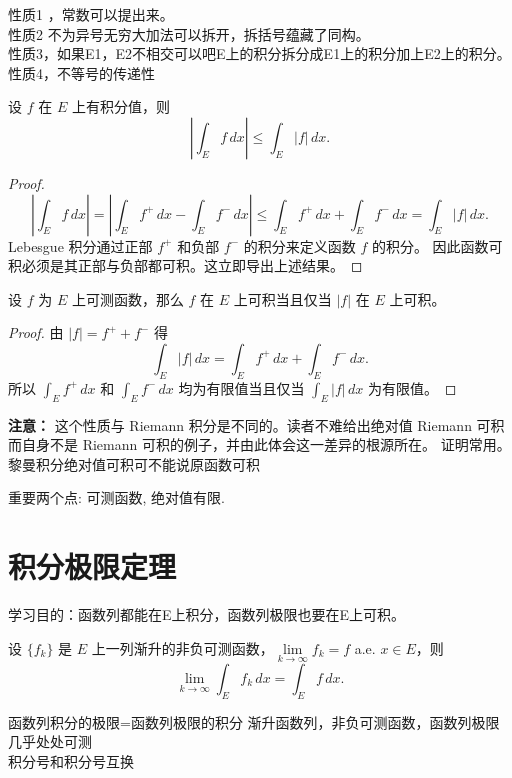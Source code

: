 \documentclass[lang=cn,10pt]{elegantbook}
\begin{document}
性质1 ，常数可以提出来。\\
性质2 不为异号无穷大加法可以拆开，拆括号蕴藏了同构。\\
性质3，如果E1，E2不相交可以吧E上的积分拆分成E1上的积分加上E2上的积分。\\
性质4，不等号的传递性\\
\begin{theorem}[4.3.3]
设 $f$ 在 $E$ 上有积分值，则
\[
\left| \int_E f\,dx \right| \le \int_E |f|\,dx.
\]
\end{theorem}

\begin{proof}
\[
\left| \int_E f\,dx \right|
= \left| \int_E f^{+}\,dx - \int_E f^{-}\,dx \right|
\le \int_E f^{+}\,dx + \int_E f^{-}\,dx
= \int_E |f|\,dx.
\]
Lebesgue 积分通过正部 $f^{+}$ 和负部 $f^{-}$ 的积分来定义函数 $f$ 的积分。  
因此函数可积必须是其正部与负部都可积。这立即导出上述结果。
\end{proof}
\begin{theorem}[4.3.4]
设 $f$ 为 $E$ 上可测函数，那么 $f$ 在 $E$ 上可积当且仅当 $|f|$ 在 $E$ 上可积。
\end{theorem}

\begin{proof}
由 $|f| = f^{+} + f^{-}$ 得
\[
\int_E |f|\,dx
= \int_E f^{+}\,dx + \int_E f^{-}\,dx.
\]
所以 $\int_E f^{+}\,dx$ 和 $\int_E f^{-}\,dx$ 均为有限值当且仅当 $\int_E |f|\,dx$ 为有限值。
\end{proof}

\noindent\textbf{注意：} 这个性质与 Riemann 积分是不同的。读者不难给出绝对值 Riemann 可积而自身不是 Riemann 可积的例子，并由此体会这一差异的根源所在。
证明常用。
黎曼积分绝对值可积可不能说原函数可积

重要两个点: 可测函数, 绝对值有限.
\section{积分极限定理}
学习目的：函数列都能在E上积分，函数列极限也要在E上可积。
\begin{theorem}[4.4.1 Levi 定理]
设 $\{f_k\}$ 是 $E$ 上一列渐升的非负可测函数，$\lim\limits_{k \to \infty} f_k = f$ a.e. $x \in E$，则
\[
\lim_{k \to \infty} \int_E f_k\,dx = \int_E f\,dx.
\]
\end{theorem}
函数列积分的极限=函数列极限的积分
渐升函数列，非负可测函数，函数列极限几乎处处可测\\

积分号和积分号互换\\
\end{document}
